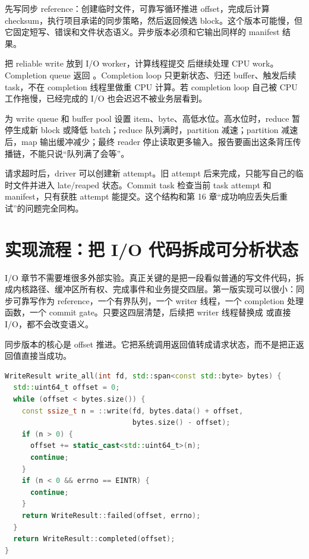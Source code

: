 先写同步 reference：创建临时文件，可靠写循环推进 offset，完成后计算 checksum，执行项目承诺的同步策略，然后返回候选 block。这个版本可能慢，但它固定短写、错误和文件状态语义。异步版本必须和它输出同样的 manifest 结果。

把 reliable write 放到 I/O worker，计算线程提交  后继续处理 CPU work。Completion queue 返回 。Completion loop 只更新状态、归还 buffer、触发后续 task，不在 completion 线程里做重 CPU 计算。若 completion loop 自己被 CPU 工作拖慢，已经完成的 I/O 也会迟迟不被业务层看到。

为 write queue 和 buffer pool 设置 item、byte、高低水位。高水位时，reduce 暂停生成新 block 或降低 batch；reduce 队列满时，partition 减速；partition 减速后，map 输出缓冲减少；最终 reader 停止读取更多输入。报告要画出这条背压传播链，不能只说“队列满了会等”。

请求超时后，driver 可以创建新 attempt。旧 attempt 后来完成，只能写自己的临时文件并进入 late/reaped 状态。Commit task 检查当前 task attempt 和 manifest，只有获胜 attempt 能提交。这个结构和第 16 章“成功响应丢失后重试”的问题完全同构。

\section{实现流程：把 I/O 代码拆成可分析状态}

I/O 章节不需要堆很多外部实验。真正关键的是把一段看似普通的写文件代码，拆成内核路径、缓冲区所有权、完成事件和业务提交四层。第一版实现可以很小：同步可靠写作为 reference，一个有界队列，一个 writer 线程，一个 completion 处理函数，一个 commit gate。只要这四层清楚，后续把 writer 线程替换成  或直接 I/O，都不会改变语义。

同步版本的核心是 offset 推进。它把系统调用返回值转成请求状态，而不是把正返回值直接当成功。

\begin{lstlisting}[language=C++,caption={可靠写循环的最小语义}]
WriteResult write_all(int fd, std::span<const std::byte> bytes) {
  std::uint64_t offset = 0;
  while (offset < bytes.size()) {
    const ssize_t n = ::write(fd, bytes.data() + offset,
                              bytes.size() - offset);
    if (n > 0) {
      offset += static_cast<std::uint64_t>(n);
      continue;
    }
    if (n < 0 && errno == EINTR) {
      continue;
    }
    return WriteResult::failed(offset, errno);
  }
  return WriteResult::completed(offset);
}
\end{lstlisting}

